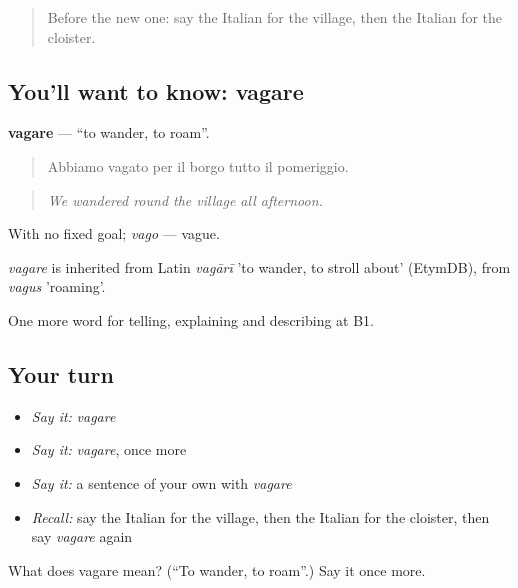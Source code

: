 \label{lesson:IT-C446-vagare}



\begin{quote}
Before the new one: say the Italian for the village, then the Italian for the cloister.
\end{quote}

\subsection*{You'll want to know: vagare}
\textbf{vagare} — \textquotedblleft{}to wander, to roam\textquotedblright{}.

\begin{quote}
Abbiamo vagato per il borgo tutto il pomeriggio.
\end{quote}

\begin{quote}
\emph{We wandered round the village all afternoon.}
\end{quote}

With no fixed goal; \emph{vago} — vague.

\begin{cousinweb}
\emph{vagare} is inherited from Latin \emph{vagārī} 'to wander, to stroll about' (EtymDB), from \emph{vagus} 'roaming'.
\end{cousinweb}

\begin{grammarlens}[title={What you've built}]
One more word for telling, explaining and describing at B1.
\end{grammarlens}

\subsection*{Your turn}
\begin{itemize}
\raggedright
  \item \emph{Say it:} \emph{vagare}
  \item \emph{Say it:} \emph{vagare}, once more
  \item \emph{Say it:} a sentence of your own with \emph{vagare}
  \item \emph{Recall:} say the Italian for the village, then the Italian for the cloister, then say \emph{vagare} again
\end{itemize}

\begin{tcolorbox}[breakable,colback=teal!4,colframe=teal!35!black,title={Before you move on}]
What does vagare mean? (\textquotedblleft{}To wander, to roam\textquotedblright{}.) Say it once more.
\end{tcolorbox}
